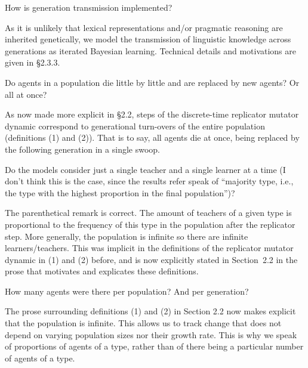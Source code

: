 \documentclass[12pt,a4paper]{article}
\newcommand{\hl}[1]{\textcolor[rgb]{.8,.33,.0}{#1}}%
\begin{document}
\vspace{.5cm}
\begin{mdframed}[backgroundcolor=gray!25,linecolor=gray!25]
How is generation transmission implemented?
\end{mdframed}
As it is unlikely that lexical representations and/or pragmatic reasoning are inherited genetically, we model the transmission of linguistic knowledge across generations as  iterated Bayesian learning. Technical details and motivations are given in \S 2.3.3.

\vspace{.5cm}
\begin{mdframed}[backgroundcolor=gray!25,linecolor=gray!25]
Do agents in a population die little by little and are replaced by new agents? Or all at once?
\end{mdframed}
\hl{As now made more explicit in \S2.2}, steps of the discrete-time replicator mutator dynamic correspond to generational turn-overs of the entire population (definitions (1) and (2)). That is to say, all agents die at once, being replaced by the following generation in a single swoop. 

\vspace{.5cm}
\begin{mdframed}[backgroundcolor=gray!25,linecolor=gray!25]
Do the models consider just a single teacher and a single learner at a time (I don't think this is the case, since the results refer speak of ``majority type, i.e., the type with the highest proportion in the final population'')?
\end{mdframed}
The parenthetical remark is correct. The amount of teachers of a given type is proportional to the frequency of this type in the population after the replicator step. More generally, the population is infinite so there are infinite learners/teachers. This was implicit in the definitions of the replicator mutator dynamic in (1) and (2) before, and is now explicitly stated in Section~2.2 in the prose that motivates and explicates these definitions.

\vspace{.5cm}
\begin{mdframed}[backgroundcolor=gray!25,linecolor=gray!25]
 How many agents were there per population? And per generation?
\end{mdframed}
The prose surrounding definitions (1) and (2) in Section 2.2 now makes explicit that the population is infinite. This allows us to track change that does not depend on varying population sizes nor their growth rate. This is why we speak of proportions of agents of a type, rather than of there being a particular number of agents of a type. 
\end{document}

